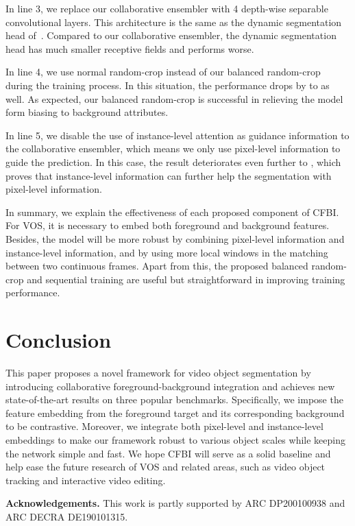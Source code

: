 \documentclass[runningheads]{llncs}
\begin{document}
In line 3, we replace our collaborative ensembler with 4 depth-wise separable convolutional layers. This architecture is the same as the dynamic segmentation head of~\cite{feelvos}. Compared to our collaborative ensembler, the dynamic segmentation head has much smaller receptive fields and performs  worse.


In line 4, we use normal random-crop instead of our balanced random-crop during the training process. In this situation, the performance drops by  to  as well. As expected, our balanced random-crop is successful in relieving the model form biasing to background attributes.

In line 5, we disable the use of instance-level attention as guidance information to the collaborative ensembler, which means we only use pixel-level information to guide the prediction. In this case, the result deteriorates even further to , which proves that instance-level information can further help the segmentation with pixel-level information.


In summary, we explain the effectiveness of each proposed component of CFBI. For VOS, it is necessary to embed both foreground and background features. Besides, the model will be more robust by combining pixel-level information and instance-level information, and by using more local windows in the matching between two continuous frames. Apart from this, the proposed balanced random-crop and sequential training are useful but straightforward in improving training performance. 



\section{Conclusion}

This paper proposes a novel framework for video object segmentation by introducing collaborative foreground-background integration and achieves new state-of-the-art results on three popular benchmarks. Specifically, we impose the feature embedding from the foreground target and its corresponding background to be contrastive. Moreover, we integrate both pixel-level and instance-level embeddings to make our framework robust to various object scales while keeping the network simple and fast. We hope CFBI will serve as a solid baseline and help ease the future research of VOS and related areas, such as video object tracking and interactive video editing.

\noindent \textbf{Acknowledgements.} This work is partly supported by ARC DP200100938 and ARC DECRA DE190101315.








\end{document}
